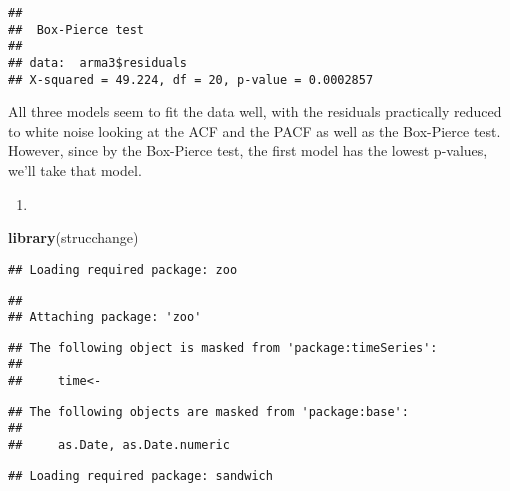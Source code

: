 \documentclass[]{article}
\newenvironment{Shaded}{\begin{snugshade}}{\end{snugshade}}
\newcommand{\KeywordTok}[1]{\textcolor[rgb]{0.13,0.29,0.53}{\textbf{#1}}}
\newcommand{\DataTypeTok}[1]{\textcolor[rgb]{0.13,0.29,0.53}{#1}}
\newcommand{\DecValTok}[1]{\textcolor[rgb]{0.00,0.00,0.81}{#1}}
\newcommand{\StringTok}[1]{\textcolor[rgb]{0.31,0.60,0.02}{#1}}
\newcommand{\OperatorTok}[1]{\textcolor[rgb]{0.81,0.36,0.00}{\textbf{#1}}}
\newcommand{\NormalTok}[1]{#1}
\begin{document}
\begin{verbatim}
## 
##  Box-Pierce test
## 
## data:  arma3$residuals
## X-squared = 49.224, df = 20, p-value = 0.0002857
\end{verbatim}

All three models seem to fit the data well, with the residuals
practically reduced to white noise looking at the ACF and the PACF as
well as the Box-Pierce test. However, since by the Box-Pierce test, the
first model has the lowest p-values, we'll take that model.

\begin{enumerate}
\def\labelenumi{\alph{enumi})}
\setcounter{enumi}{3}
\item
\end{enumerate}

\begin{Shaded}
\begin{Highlighting}[]
\KeywordTok{library}\NormalTok{(strucchange)}
\end{Highlighting}
\end{Shaded}

\begin{verbatim}
## Loading required package: zoo
\end{verbatim}

\begin{verbatim}
## 
## Attaching package: 'zoo'
\end{verbatim}

\begin{verbatim}
## The following object is masked from 'package:timeSeries':
## 
##     time<-
\end{verbatim}

\begin{verbatim}
## The following objects are masked from 'package:base':
## 
##     as.Date, as.Date.numeric
\end{verbatim}

\begin{verbatim}
## Loading required package: sandwich
\end{verbatim}

\begin{Shaded}
\end{Shaded}
\end{document}
